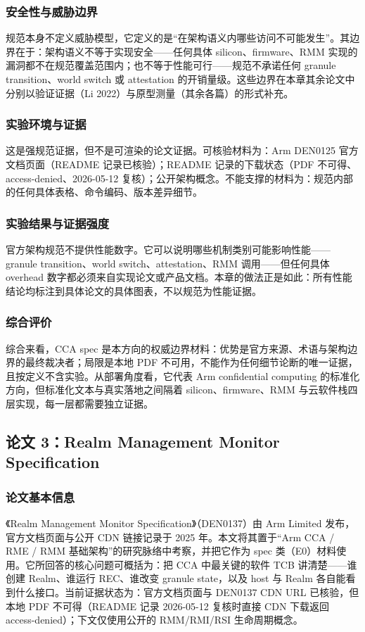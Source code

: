 \documentclass[11pt]{ctexart}
\begin{document}
\subsubsection{安全性与威胁边界}
规范本身不定义威胁模型，它定义的是“在架构语义内哪些访问不可能发生”。其边界在于：架构语义不等于实现安全——任何具体 silicon、firmware、RMM 实现的漏洞都不在规范覆盖范围内；也不等于性能可行——规范不承诺任何 granule transition、world switch 或 attestation 的开销量级。这些边界在本章其余论文中分别以验证证据（Li 2022）与原型测量（其余各篇）的形式补充。\par
\subsubsection{实验环境与证据}
这是强规范证据，但不是可渲染的论文证据。可核验材料为：Arm DEN0125 官方文档页面（README 记录已核验）；README 记录的下载状态（PDF 不可得、access-denied、2026-05-12 复核）；公开架构概念。不能支撑的材料为：规范内部的任何具体表格、命令编码、版本差异细节。\par
\subsubsection{实验结果与证据强度}
官方架构规范不提供性能数字。它可以说明哪些机制类别可能影响性能——granule transition、world switch、attestation、RMM 调用——但任何具体 overhead 数字都必须来自实现论文或产品文档。本章的做法正是如此：所有性能结论均标注到具体论文的具体图表，不以规范为性能证据。\par
\subsubsection{综合评价}
综合来看，CCA spec 是本方向的权威边界材料：优势是官方来源、术语与架构边界的最终裁决者；局限是本地 PDF 不可用，不能作为任何细节论断的唯一证据，且按定义不含实验。从部署角度看，它代表 Arm confidential computing 的标准化方向，但标准化文本与真实落地之间隔着 silicon、firmware、RMM 与云软件栈四层实现，每一层都需要独立证据。\par

\subsection{论文 3：Realm Management Monitor Specification}
\subsubsection{论文基本信息}
《Realm Management Monitor Specification》（DEN0137）由 Arm Limited 发布，官方文档页面与公开 CDN 链接记录于 2025 年。本文将其置于“Arm CCA / RME / RMM 基础架构”的研究脉络中考察，并把它作为 spec 类（E0）材料使用。它所回答的核心问题可概括为：把 CCA 中最关键的软件 TCB 讲清楚——谁创建 Realm、谁运行 REC、谁改变 granule state，以及 host 与 Realm 各自能看到什么接口。当前证据状态为：官方文档页面与 DEN0137 CDN URL 已核验，但本地 PDF 不可得（README 记录 2026-05-12 复核时直接 CDN 下载返回 access-denied）；下文仅使用公开的 RMM/RMI/RSI 生命周期概念。\cite{arm_rmm_spec}\par
\end{document}
